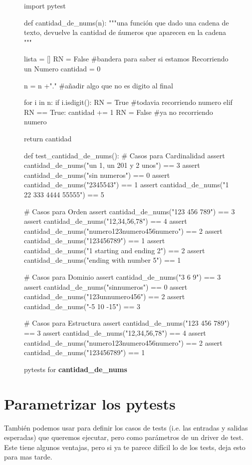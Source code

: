 \begin{figure}[T]
\begin{python}
import pytest

def cantidad_de_nums(n):
    """una función que dado una cadena de texto,
    devuelve la cantidad de ńumeros que aparecen
    en la cadena
    """
    
    lista = []
    RN = False #bandera para saber si estamos Recorriendo un Numero
    cantidad = 0

    n = n +"." #añadir algo que no es digito al final 

    for i in n:
        if i.isdigit():
            RN = True #todavia recorriendo numero
        elif RN == True:
            cantidad += 1
            RN = False #ya no recorriendo numero
            
    return cantidad

def test_cantidad_de_nums():
    # Casos para Cardinalidad
    assert cantidad_de_nums("un 1, un 201 y 2 unos") == 3
    assert cantidad_de_nums("sin numeros") == 0
    assert cantidad_de_nums("2345543") == 1
    assert cantidad_de_nums("1 22 333 4444 55555") == 5
    
    # Casos para Orden
    assert cantidad_de_nums("123 456 789") == 3
    assert cantidad_de_nums("12,34,56,78") == 4
    assert cantidad_de_nums("numero123numero456numero") == 2
    assert cantidad_de_nums("123456789") == 1
    assert cantidad_de_nums("1 starting and ending 2") == 2
    assert cantidad_de_nums("ending with number 5") == 1
    
    # Casos para Dominio
    assert cantidad_de_nums("3 6 9") == 3
    assert cantidad_de_nums("sinnumeros") == 0
    assert cantidad_de_nums("123unnumero456") == 2
    assert cantidad_de_nums("-5 10 -15") == 3
    
    # Casos para Estructura
    assert cantidad_de_nums("123 456 789") == 3
    assert cantidad_de_nums("12,34,56,78") == 4
    assert cantidad_de_nums("numero123numero456numero") == 2
    assert cantidad_de_nums("123456789") == 1
\end{python}
\caption{pytests for \textbf{cantidad\_de\_nums}}
\label{test_cantidad_de_nums}
\end{figure}


\section{Parametrizar los pytests}

También podemos usar  para definir los casos de tests (i.e. las entradas y salidas esperadas) que queremos ejecutar, pero como parámetros de un driver de test.
%
Este tiene algunos ventajas, pero si ya te parece difícil lo de los tests, deja esto para mas tarde.

